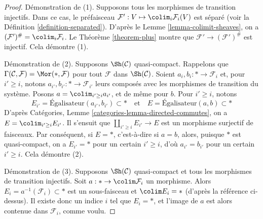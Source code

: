 \begin{proof}
Démonstration de (1). Supposons tous les morphismes de transition injectifs.
Dans ce cas, le préfaisceau
$\mathcal{F}' : V \mapsto \colim_i \mathcal{F}_i(V)$ est
séparé (voir la Définition \ref{definition-separated}).
D’après le Lemme \ref{lemma-colimit-sheaves}, on a
$(\mathcal{F}')^\# = \colim_i \mathcal{F}_i$.
Le Théorème \ref{theorem-plus} montre que
$\mathcal{F}' \to (\mathcal{F}')^\#$ est injectif.
Cela démontre (1).

\medskip\noindent
Démonstration de (2). Supposons $\Sh(\mathcal{C})$ quasi-compact.
Rappelons que $\Gamma(\mathcal{C}, \mathcal{F}) = \Mor(*, \mathcal{F})$
pour tout $\mathcal{F}$ dans $\Sh(\mathcal{C})$.
Soient $a_i, b_i : * \to \mathcal{F}_i$ et, pour
$i' \geq i$, notons $a_{i'}, b_{i'} : * \to \mathcal{F}_{i'}$
leurs composés avec les morphismes de transition du système.
Posons $a = \colim_{i' \geq i} a_{i'}$, et de même pour $b$.
Pour $i' \geq i$, notons
$$
E_{i'} = \text{Égalisateur}(a_{i'}, b_{i'}) \subset *
\quad\text{et}\quad
E = \text{Égalisateur}(a, b) \subset *
$$
D’après Catégories, Lemme \ref{categories-lemma-directed-commutes}, on a
$E = \colim_{i' \geq i} E_{i'}$. Il s’ensuit que
$\coprod_{i' \geq i} E_{i'} \to E$
est un morphisme surjectif de faisceaux. Par conséquent, si $E = *$,
c’est-à-dire si $a = b$, alors, puisque $*$ est quasi-compact,
on a $E_{i'} = *$ pour un certain $i' \geq i$, d’où
$a_{i'} = b_{i'}$ pour un certain $i' \geq i$.
Cela démontre (2).

\medskip\noindent
Démonstration de (3). Supposons $\Sh(\mathcal{C})$ quasi-compact et tous
les morphismes de transition injectifs. Soit
$a : * \to \colim \mathcal{F}_i$ un morphisme. Alors
$E_i = a^{-1}(\mathcal{F}_i) \subset *$ est un sous-faisceau et
$\colim E_i = *$ (d’après la référence ci-dessus). Il existe donc
un indice $i$ tel que $E_i = *$, et l’image de $a$ est alors
contenue dans $\mathcal{F}_i$, comme voulu.


\end{proof}
